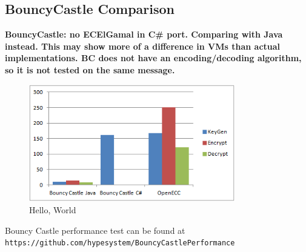 \subsection{BouncyCastle Comparison}
\label{sec:performance_bouncycastle}

\textbf{BouncyCastle: no ECElGamal in C\# port. Comparing with Java instead. This may show more of a difference in VMs than actual
implementations. BC does not have an encoding/decoding algorithm, so it is not tested on the same message.}

\begin{figure}[htb!]
	\centering
	\includegraphics[width=0.8\textwidth]{performance/bouncycastle-comparison}
	\caption{Hello, World}
	\label{fig:bouncycastle-comparison-graph}
\end{figure}

Bouncy Castle performance test can be found at \verb+https://github.com/hypesystem/BouncyCastlePerformance+